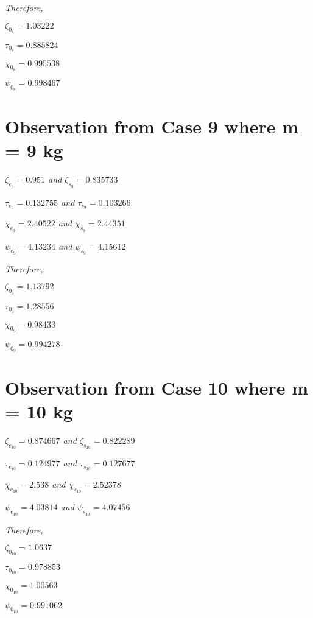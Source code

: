     \textit{Therefore,}
            
    $\zeta_{0_8} = 1.03222$
            
    $\tau_{0_8} = 0.885824$
            
    $\chi_{0_8} = 0.995538$
            
    $\psi_{0_8} = 0.998467$    
            
        
        
\section{{Observation from Case 9 where m = 9 kg}}
        
    \textit{$\zeta_{e_9} = 0.951$ and $\zeta_{s_9} = 0.835733$}
            
    \textit{$\tau_{e_9} = 0.132755$ and $\tau_{s_9} = 0.103266$}
            
    \textit{$\chi_{e_9} = 2.40522$ and $\chi_{s_9} = 2.44351$}
            
    \textit{$\psi_{e_9} = 4.13234$ and $\psi_{s_9} = 4.15612$}
            
    \textit{Therefore,}
            
    $\zeta_{0_9} = 1.13792$
            
    $\tau_{0_9} = 1.28556$
            
    $\chi_{0_9} = 0.98433$
            
    $\psi_{0_9} = 0.994278$    
            
        
        
\section{{Observation from Case 10 where m = 10 kg}}
        
    \textit{$\zeta_{e_{10}} = 0.874667$ and $\zeta_{s_{10}} = 0.822289$}
            
    \textit{$\tau_{e_{10}} = 0.124977$ and $\tau_{s_{10}} = 0.127677$}
            
    \textit{$\chi_{e_{10}} = 2.538$ and $\chi_{s_{10}} = 2.52378$}
            
    \textit{$\psi_{e_{10}} = 4.03814$ and $\psi_{s_{10}} = 4.07456$}
            
    \textit{Therefore,}
            
    $\zeta_{0_{10}} = 1.0637$
            
    $\tau_{0_{10}} = 0.978853$
            
    $\chi_{0_{10}} = 1.00563$
            
    $\psi_{0_{10}} = 0.991062$    
            
        
        




